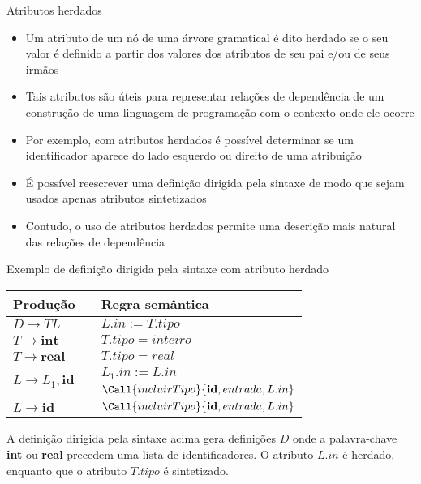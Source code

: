 \begin{frame}[fragile]{Atributos herdados}

    \begin{itemize}
        \item Um atributo de um nó de uma árvore gramatical é dito herdado se o seu valor é definido a partir dos valores dos atributos
            de seu pai e/ou de seus irmãos

        \item Tais atributos são úteis para representar relações de dependência de um construção de uma linguagem de programação com
            o contexto onde ele ocorre

        \item Por exemplo, com atributos herdados é possível determinar se um identificador aparece do lado esquerdo ou direito de
            uma atribuição

        \item É possível reescrever uma definição dirigida pela sintaxe de modo que sejam usados apenas atributos sintetizados

        \item Contudo, o uso de atributos herdados permite uma descrição mais natural das relações de dependência
    \end{itemize}

\end{frame}

\begin{frame}[fragile]{Exemplo de definição dirigida pela sintaxe com atributo herdado}

    \begin{table}
        \centering
        \begin{tabular}{lp{2cm}l} 
        \toprule
        \textbf{Produção} & & \textbf{Regra semântica} \\
        \midrule
        \rowcolor[gray]{0.9}
        $D\to TL$ & & $L.in := T.tipo$ \\
        $T\to \textbf{int}$ & & $T.tipo = inteiro$ \\
        \rowcolor[gray]{0.9}
        $T\to \textbf{real}$ & & $T.tipo = real$ \\
        \multirow{2}{*}{$L\to L_1, \textbf{id}$} & & $L_1.in := L.in$ \\
        & & $\Call{incluirTipo}{\textbf{id}, entrada, L.in}$ \\
        \rowcolor[gray]{0.9}
        $L\to \textbf{id}$ & & $\Call{incluirTipo}{\textbf{id}, entrada, L.in}$ \\
        \bottomrule
        \end{tabular}
    \end{table}

    \vspace{0.2in}

    A definição dirigida pela sintaxe acima gera definições $D$ onde a palavra-chave \textbf{int} ou \textbf{real} precedem uma lista
        de identificadores. O atributo $L.in$ é herdado, enquanto que o atributo $T.tipo$ é sintetizado.
\end{frame}

